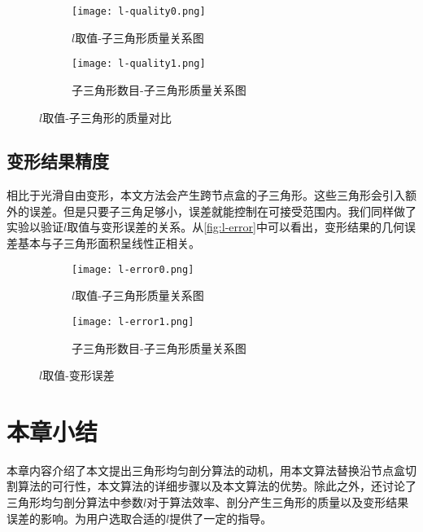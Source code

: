 \begin{figure}[htbp]
	\centering
	\begin{subfigure}[b]{.45\textwidth}
		\centering
		\texttt{[image: l-quality0.png]}
		\caption{$l$取值-子三角形质量关系图}\label{subfig:l-quality0}
	\end{subfigure}%
	\begin{subfigure}[b]{.45\textwidth}
		\centering
		\texttt{[image: l-quality1.png]}
		\caption{子三角形数目-子三角形质量关系图}\label{subfig:l-quality1}
	\end{subfigure}
	\caption{$l$取值-子三角形的质量对比}\label{fig:l-quality}
\end{figure}

\subsection{变形结果精度}
相比于光滑自由变形，本文方法会产生跨节点盒的子三角形。这些三角形会引入额外的误差。但是只要子三角足够小，误差就能控制在可接受范围内。我们同样做了实验以验证$l$取值与变形误差的关系。从\autoref{fig:l-error}中可以看出，变形结果的几何误差基本与子三角形面积呈线性正相关。
\begin{figure}[htbp]
	\centering
	\begin{subfigure}[b]{.45\textwidth}
		\centering
		\texttt{[image: l-error0.png]}
		\caption{$l$取值-子三角形质量关系图}\label{subfig:l-error0}
	\end{subfigure}%
	\begin{subfigure}[b]{.45\textwidth}
		\centering
		\texttt{[image: l-error1.png]}
		\caption{子三角形数目-子三角形质量关系图}\label{subfig:l-error1}
	\end{subfigure}
	\caption{$l$取值-变形误差}\label{fig:l-error}
\end{figure}

\section{本章小结}
本章内容介绍了本文提出三角形均匀剖分算法的动机，用本文算法替换沿节点盒切割算法的可行性，本文算法的详细步骤以及本文算法的优势。除此之外，还讨论了三角形均匀剖分算法中参数$l$对于算法效率、剖分产生三角形的质量以及变形结果误差的影响。为用户选取合适的$l$提供了一定的指导。

